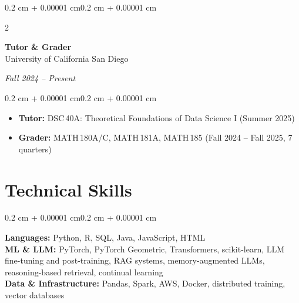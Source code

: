 \documentclass[10pt, letterpaper]{article}
\newenvironment{highlights}{
    \begin{itemize}[
        topsep=0.10 cm,
        parsep=0.10 cm,
        partopsep=0pt,
        itemsep=0pt,
        leftmargin=0.4 cm + 10pt
    ]
}{\end{itemize}}
\newenvironment{onecolentry}{
    \begin{adjustwidth}{0.2 cm + 0.00001 cm}{0.2 cm + 0.00001 cm}
}{\end{adjustwidth}}
\newenvironment{twocolentry}[2][]{
    \onecolentry
    \def\secondColumn{#2}
    \setcolumnwidth{\fill, 4.5 cm}
    \begin{paracol}{2}
}{
    \switchcolumn \raggedleft \secondColumn
    \end{paracol}
    \endonecolentry
}
\begin{document}
    \begin{twocolentry}{\textit{Fall 2024 -- Present}}
        \textbf{Tutor \& Grader}\\
        University of California San Diego
    \end{twocolentry}

    \vspace{0.10 cm}
    \begin{onecolentry}
        \begin{highlights}
            \item \textbf{Tutor:} DSC\,40A: Theoretical Foundations of Data Science I (Summer 2025)
            \item \textbf{Grader:} MATH\,180A/C, MATH\,181A, MATH\,185 (Fall 2024 -- Fall 2025, 7 quarters)
        \end{highlights}
    \end{onecolentry}

    \section{Technical Skills}

    \begin{onecolentry}
        \textbf{Languages:} Python, R, SQL, Java, JavaScript, HTML\\[2pt]
        \textbf{ML \& LLM:} PyTorch, PyTorch Geometric, Transformers, scikit-learn, LLM fine-tuning and post-training, RAG systems, memory-augmented LLMs, reasoning-based retrieval, continual learning\\[2pt]
        \textbf{Data \& Infrastructure:} Pandas, Spark, AWS, Docker, distributed training, vector databases
    \end{onecolentry}
\end{document}

